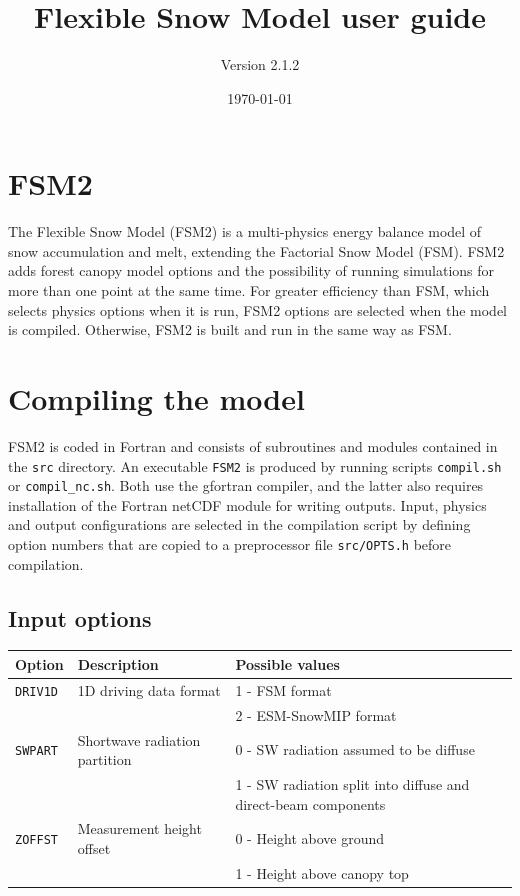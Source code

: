 \documentclass{article}
\title{Flexible Snow Model user guide}
\author{Version 2.1.2}
\date{\today}
\begin{document}
\maketitle
\parindent0pt

\section{FSM2}

The Flexible Snow Model (FSM2) is a multi-physics energy balance model of snow accumulation and melt, extending the Factorial Snow Model (FSM). FSM2 adds forest canopy model options and the possibility of running simulations for more than one point at the same time. For greater efficiency than FSM, which selects physics options when it is run, FSM2 options are selected when the model is compiled. Otherwise, FSM2 is built and run in the same way as FSM.

\section{Compiling the model}

FSM2 is coded in Fortran and consists of subroutines and modules contained in the {\tt src} directory. An executable {\tt FSM2} is produced by running scripts {\tt compil.sh} or {\tt compil\_nc.sh}. Both use the gfortran compiler, and the latter also requires installation of the Fortran netCDF module for writing outputs. Input, physics and output configurations are selected in the compilation script by defining option numbers that are copied to a preprocessor file {\tt src/OPTS.h} before compilation.

\subsection{Input options }
\begin{longtable}{|l|l|l|} \hline
Option       & Description & Possible values \\ \hline
{\tt DRIV1D} & 1D driving data format
&   1 - FSM format \\
& & 2 - ESM-SnowMIP format \\ \hline
{\tt SWPART} & Shortwave radiation partition
&   0 - SW radiation assumed to be diffuse \\
& & 1 - SW radiation split into diffuse and direct-beam components \\ \hline
{\tt ZOFFST} & Measurement height offset
&   0 - Height above ground \\
& & 1 - Height above canopy top \\ \hline
\end{longtable}
\end{document}
